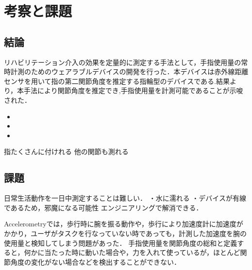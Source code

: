 \chapter{考察と課題}

\section{結論}
リハビリテーション介入の効果を定量的に測定する手法として，手指使用量の常時計測のためのウェアラブルデバイスの開発を行った．本デバイスは赤外線距離センサを用いて指の第二関節角度を推定する指輪型のデバイスである.結果より，本手法により関節角度を推定でき,手指使用量を計測可能であることが示唆された．


\begin{itemize}
 \item 
 \item 
 \item 
\end{itemize}


指たくさんに付けれる
他の関節も測れる

\section{課題}
日常生活動作を一日中測定することは難しい．
・水に濡れる
・デバイスが有線であるため，邪魔になる可能性
エンジニアリングで解消できる．

Accelerometryでは，歩行時に腕を振る動作や，歩行により加速度計に加速度がかかり，ユーザがタスクを行なっていない時であっても，計測した加速度を腕の使用量と検知してしまう問題があった．
手指使用量を関節角度の総和と定義すると，何かに当たった時に動いた場合や，力を入れて使っているが，ほとんど関節角度の変化がない場合などを検出することができない．